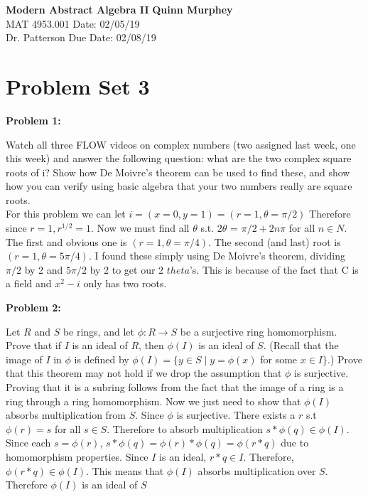 \documentclass[letter paper, 12pt]{article}
\begin{document}
\noindent
\large\textbf{Modern Abstract Algebra II} \hfill \textbf{Quinn Murphey} \\
\normalsize MAT 4953.001 \hfill Date: 02/05/19 \\
Dr. Patterson \hfill Due Date: 02/08/19 \\
\noindent\makebox[\linewidth]{\rule{\paperwidth}{0.4pt}}

\section*{Problem Set 3}
\doublespacing
\textbf{Problem 1:}
    
     Watch all three FLOW videos on complex numbers (two assigned last week, one this week) and answer  the  following  question:  what  are  the  two  complex  square  roots  of i?   Show  how  De Moivre's theorem can be used to find these, and show how you can verify using basic algebra that your two numbers really are square roots.\\
    
    For this problem we can let $i=(x=0,y=1)=(r=1,\theta =\pi/2)$ Therefore since $r=1, r^{1/2}=1.$ Now we must find all $\theta$ s.t. $2\theta$ = $\pi/2 + 2n\pi$ for all $n\in N$. The first and obvious one is $(r=1,\theta=\pi/4)$. The second (and last) root is $(r=1,\theta=5\pi/4)$. I found these simply using De Moivre's theorem, dividing $\pi/2$ by 2 and $5\pi/2$ by 2 to get our 2 $theta$'s. This is because of the fact that C is a field and $x^2-i$ only has two roots.
    
\noindent\textbf{Problem 2:}
    
     Let $R$ and $S$ be rings,  and let $\phi :R\rightarrow S$ be a surjective ring homomorphism. Prove that if $I$ is an ideal of $R$,  then $\phi(I)$ is an ideal of $S$. (Recall that the image of $I$ in $\phi$ is defined by $\phi(I) =\{y\in S\mid y=\phi(x) $ for some $ x\in I\}$.)   Prove  that  this  theorem  may  not  hold  if  we drop the assumption that $\phi$ is surjective.\\
    
    Proving that it is a subring follows from the fact that the image of a ring is a ring through a ring homomorphism. Now we just need to show that $\phi(I)$ absorbs multiplication from $S$. Since $\phi$ is surjective. There exists a $r$ s.t $\phi(r)=s$ for all $s\in S$. Therefore to absorb multiplication $s*\phi(q)\in\phi(I)$. Since each $s=\phi(r)$, $s*\phi(q)=\phi(r)*\phi(q)=\phi(r*q)$ due to homomorphism properties. Since $I$ is an ideal, $r*q\in I$. Therefore, $\phi(r*q)\in\phi(I)$. This means that $\phi(I)$ absorbs multiplication over $S$. Therefore $\phi(I)$ is an ideal of $S$
\end{document}
